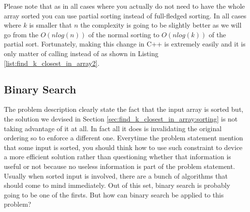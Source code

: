 Please note that as in all cases where you actually do not need to have the whole array sorted you
can use partial sorting instead of full-fledged sorting. In all cases where $k$ is smaller that
$n$ the complexity is going to be slightly better as we will go from the $O(nlog(n))$ of the normal
sorting to $O(nlog(k))$ of the partial sort. Fortunately, making this change in C++ is extremely
easily and it is only matter of calling  instead of  as
shown in Listing \ref{list:find_k_closest_in_array2}.



\subsection{Binary Search}
\label{find_k_closest_in_array:sec:binary_search}
The problem description clearly state the fact that the input array is sorted but, the solution we
devised in Section \ref{sec:find_k_closest_in_array:sorting} is not taking advantage of it at all.
In fact all it does is invalidating the original ordering so to enforce a different one. Everytime
the problem statement mention that some input is sorted, you should think how to use such constraint
to device a more efficient solution rather than questioning whether that information is useful or
not because no useless information is part of the problem statement. Usually when sorted input is
involved, there are a bunch of algorithms that should come to mind immediately. Out of this set, binary
search is probably going to be one of the firsts. But how can binary search be applied to this
problem?

